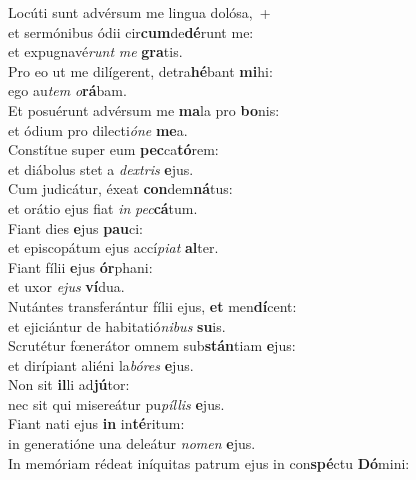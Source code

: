 \evenverse Locúti sunt advérsum me lingua dolósa,~+\\\evenverse  et sermónibus ódii cir\textbf{cum}de\textbf{dé}runt me:~\*\\
\evenverse et expugnavé\textit{runt} \textit{me} \textbf{gra}tis.\\
\oddverse Pro eo ut me dilígerent, detra\textbf{hé}bant \textbf{mi}hi:~\*\\
\oddverse ego au\textit{tem} \textit{o}\textbf{rá}bam.\\
\evenverse Et posuérunt advérsum me \textbf{ma}la pro \textbf{bo}nis:~\*\\
\evenverse et ódium pro dilecti\textit{ó}\textit{ne} \textbf{me}a.\\
\oddverse Constítue super eum \textbf{pec}ca\textbf{tó}rem:~\*\\
\oddverse et diábolus stet a \textit{dex}\textit{tris} \textbf{e}jus.\\
\evenverse Cum judicátur, éxeat \textbf{con}dem\textbf{ná}tus:~\*\\
\evenverse et orátio ejus fiat \textit{in} \textit{pec}\textbf{cá}tum.\\
\oddverse Fiant dies \textbf{e}jus \textbf{pau}ci:~\*\\
\oddverse et episcopátum ejus accí\textit{pi}\textit{at} \textbf{al}ter.\\
\evenverse Fiant fílii \textbf{e}jus \textbf{ór}phani:~\*\\
\evenverse et uxor \textit{e}\textit{jus} \textbf{ví}dua.\\
\oddverse Nutántes transferántur fílii ejus, \textbf{et} men\textbf{dí}cent:~\*\\
\oddverse et ejiciántur de habitatió\textit{ni}\textit{bus} \textbf{su}is.\\
\evenverse Scrutétur fœnerátor omnem sub\textbf{stán}tiam \textbf{e}jus:~\*\\
\evenverse et dirípiant aliéni la\textit{bó}\textit{res} \textbf{e}jus.\\
\oddverse Non sit \textbf{il}li ad\textbf{jú}tor:~\*\\
\oddverse nec sit qui misereátur pu\textit{píl}\textit{lis} \textbf{e}jus.\\
\evenverse Fiant nati ejus \textbf{in} in\textbf{té}ritum:~\*\\
\evenverse in generatióne una deleátur \textit{no}\textit{men} \textbf{e}jus.\\
\oddverse In memóriam rédeat iníquitas patrum ejus in con\textbf{spé}ctu \textbf{Dó}mini:~\*\\
